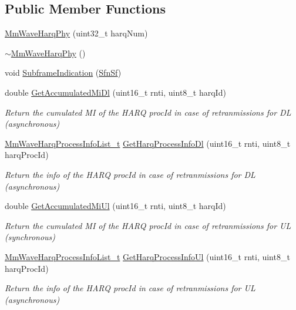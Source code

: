 \subsection*{Public Member Functions}
\begin{DoxyCompactItemize}
\item 
\hyperlink{classns3_1_1MmWaveHarqPhy_ac188d6dd803f0fb2e7e349fedc67068c}{Mm\+Wave\+Harq\+Phy} (uint32\+\_\+t harq\+Num)
\item 
\hyperlink{classns3_1_1MmWaveHarqPhy_a949a2898e28d3a35dc7d36d77f875572}{$\sim$\+Mm\+Wave\+Harq\+Phy} ()
\item 
void \hyperlink{classns3_1_1MmWaveHarqPhy_a81f0184522412eff11f03abc6d4b60c6}{Subframe\+Indication} (\hyperlink{structns3_1_1SfnSf}{Sfn\+Sf})
\item 
double \hyperlink{classns3_1_1MmWaveHarqPhy_a746a755eb45b8a9af7d67e6dccede66c}{Get\+Accumulated\+Mi\+Dl} (uint16\+\_\+t rnti, uint8\+\_\+t harq\+Id)
\begin{DoxyCompactList}\small\item\em Return the cumulated MI of the H\+A\+RQ proc\+Id in case of retranmissions for DL (asynchronous) \end{DoxyCompactList}\item 
\hyperlink{namespacens3_aca7c6bab455c2515f3e437749b5e904d}{Mm\+Wave\+Harq\+Process\+Info\+List\+\_\+t} \hyperlink{classns3_1_1MmWaveHarqPhy_a810e0f85341865845c2816638e057cb1}{Get\+Harq\+Process\+Info\+Dl} (uint16\+\_\+t rnti, uint8\+\_\+t harq\+Proc\+Id)
\begin{DoxyCompactList}\small\item\em Return the info of the H\+A\+RQ proc\+Id in case of retranmissions for DL (asynchronous) \end{DoxyCompactList}\item 
double \hyperlink{classns3_1_1MmWaveHarqPhy_a7d0b80df5e84b7c47d3e7dace0afef9d}{Get\+Accumulated\+Mi\+Ul} (uint16\+\_\+t rnti, uint8\+\_\+t harq\+Id)
\begin{DoxyCompactList}\small\item\em Return the cumulated MI of the H\+A\+RQ proc\+Id in case of retranmissions for UL (synchronous) \end{DoxyCompactList}\item 
\hyperlink{namespacens3_aca7c6bab455c2515f3e437749b5e904d}{Mm\+Wave\+Harq\+Process\+Info\+List\+\_\+t} \hyperlink{classns3_1_1MmWaveHarqPhy_a00ac8cbd00d0ff533f104a6032346b33}{Get\+Harq\+Process\+Info\+Ul} (uint16\+\_\+t rnti, uint8\+\_\+t harq\+Proc\+Id)
\begin{DoxyCompactList}\small\item\em Return the info of the H\+A\+RQ proc\+Id in case of retranmissions for UL (asynchronous) \end{DoxyCompactList}\item 

\end{DoxyCompactItemize}
